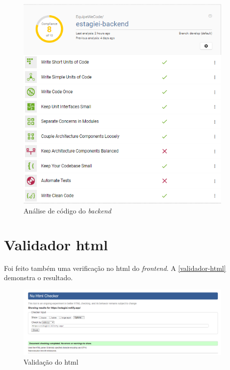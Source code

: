 \begin{figure}[H]
	\centering
	\caption{\label{better-code-back}Análise de código do \textit{\gls{backend}}}
	\includegraphics[width=0.95\textwidth]{../imagens/web-tests/better-code-back.png}
\end{figure}

\section{Validador \ac{html}}
Foi feito também uma verificação no \ac{html} do \textit{\gls{frontend}}. A \autoref{validador-html} demonstra o resultado.

\begin{figure}[H]
	\centering
	\caption{\label{validador-html}Validação do \ac{html}}
	\includegraphics[width=0.95\textwidth]{../imagens/web-tests/validador-html.png}
\end{figure}